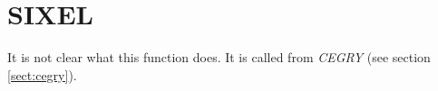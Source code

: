 \section{SIXEL}
\label{sect:sixel}

\noindent It is not clear what this function does. It is called from {\em
CEGRY} (see section \ref{sect:cegry}).\\
